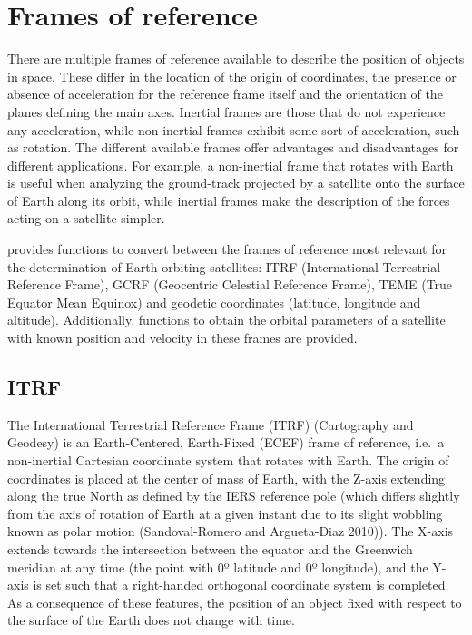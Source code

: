 \hypertarget{frames-of-reference}{%
\section{Frames of reference}\label{frames-of-reference}}

There are multiple frames of reference available to describe the position of objects in space. These differ in the location of the origin of coordinates, the presence or absence of acceleration for the reference frame itself and the orientation of the planes defining the main axes. Inertial frames are those that do not experience any acceleration, while non-inertial frames exhibit some sort of acceleration, such as rotation. The different available frames offer advantages and disadvantages for different applications. For example, a non-inertial frame that rotates with Earth is useful when analyzing the ground-track projected by a satellite onto the surface of Earth along its orbit, while inertial frames make the description of the forces acting on a satellite simpler.

 provides functions to convert between the frames of reference most relevant for the determination of Earth-orbiting satellites: ITRF (International Terrestrial Reference Frame), GCRF (Geocentric Celestial Reference Frame), TEME (True Equator Mean Equinox) and geodetic coordinates (latitude, longitude and altitude). Additionally, functions to obtain the orbital parameters of a satellite with known position and velocity in these frames are provided.

\hypertarget{itrf}{%
\subsection{ITRF}\label{itrf}}

The International Terrestrial Reference Frame (ITRF) (Cartography and Geodesy) is an Earth-Centered, Earth-Fixed (ECEF) frame of reference, i.e.~a non-inertial Cartesian coordinate system that rotates with Earth. The origin of coordinates is placed at the center of mass of Earth, with the Z-axis extending along the true North as defined by the IERS reference pole (which differs slightly from the axis of rotation of Earth at a given instant due to its slight wobbling known as polar motion (Sandoval-Romero and Argueta-Diaz 2010)). The X-axis extends towards the intersection between the equator and the Greenwich meridian at any time (the point with 0º latitude and 0º longitude), and the Y-axis is set such that a right-handed orthogonal coordinate system is completed. As a consequence of these features, the position of an object fixed with respect to the surface of the Earth does not change with time.

